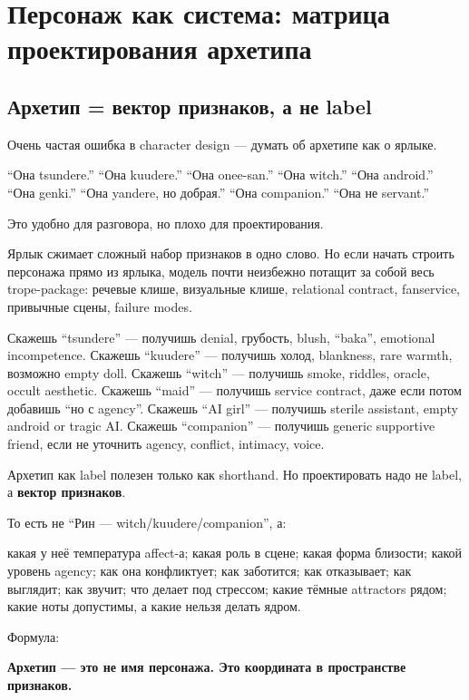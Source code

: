 \setcounter{chapter}{9}
\chapter{Персонаж как система: матрица проектирования архетипа}

\setcounter{section}{0}
\section{Архетип = вектор признаков, а не label}

Очень частая ошибка в character design --- думать об архетипе как о
ярлыке.

``Она tsundere.'' ``Она kuudere.'' ``Она onee-san.'' ``Она witch.''
``Она android.'' ``Она genki.'' ``Она yandere, но добрая.'' ``Она
companion.'' ``Она не servant.''

Это удобно для разговора, но плохо для проектирования.

Ярлык сжимает сложный набор признаков в одно слово. Но если начать
строить персонажа прямо из ярлыка, модель почти неизбежно потащит за
собой весь trope-package: речевые клише, визуальные клише, relational
contract, fanservice, привычные сцены, failure modes.

Скажешь ``tsundere'' --- получишь denial, грубость, blush, ``baka'',
emotional incompetence. Скажешь ``kuudere'' --- получишь холод,
blankness, rare warmth, возможно empty doll. Скажешь ``witch'' ---
получишь smoke, riddles, oracle, occult aesthetic. Скажешь ``maid'' ---
получишь service contract, даже если потом добавишь ``но с agency''.
Скажешь ``AI girl'' --- получишь sterile assistant, empty android or
tragic AI. Скажешь ``companion'' --- получишь generic supportive friend,
если не уточнить agency, conflict, intimacy, voice.

Архетип как label полезен только как shorthand. Но проектировать надо не
label, а \textbf{вектор признаков}.

То есть не ``Рин --- witch/\hspace{0pt}kuudere/\hspace{0pt}companion'', а:

какая у неё температура affect-а; какая роль в сцене; какая форма
близости; какой уровень agency; как она конфликтует; как заботится; как
отказывает; как выглядит; как звучит; что делает под стрессом; какие
тёмные attractors рядом; какие ноты допустимы, а какие нельзя делать
ядром.

Формула:

\textbf{Архетип --- это не имя персонажа. Это координата в пространстве
признаков.}

